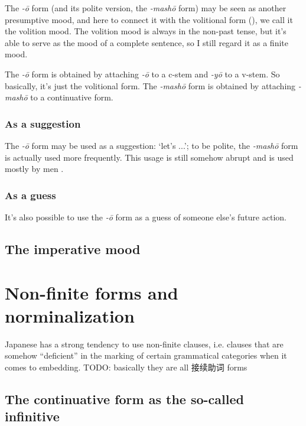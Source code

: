 \documentclass[UTF8, a4paper, oneside, scheme=plain]{ctexrep}
\newcommand*{\citepage}[1]{pp.~{#1}}
\newcommand{\corpus}[1]{\emph{#1}}
\newcommand{\translate}[1]{`#1'}
\begin{document}
The \corpus{-\={o}} form (and its polite version, the \corpus{-mash\={o}} form) 
may be seen as another presumptive mood,
and here to connect it with the volitional form (),
we call it the volition mood.
The volition mood is always in the non-past tense,
but it's able to serve as the mood of a complete sentence,
so I still regard it as a finite mood. 

The \corpus{-\={o}} form is obtained by attaching \corpus{-\={o}} to a c-stem 
and \corpus{-y\={o}} to a v-stem.
So basically, it's just the volitional form.
The \corpus{-mash\={o}} form is obtained by attaching \corpus{-mash\={o}} to a continuative form.

\subsubsection{As a suggestion}

The \corpus{-\={o}} form may be used as a suggestion: \translate{let's ...};
to be polite, the \corpus{-mash\={o}} form is actually used more frequently.
This usage is still somehow abrupt and is used mostly by men \citep[\citepage{112}]{akiyama2012japanese}.

\subsubsection{As a guess}

It's also possible to use the \corpus{-\={o}} form as a guess of someone else's future action.

\subsection{The imperative mood}\label{sec:imperative}

\section{Non-finite forms and norminalization}\label{sec:non-finite}

Japanese has a strong tendency to use non-finite clauses,
i.e. clauses that are somehow ``deficient'' in the marking of certain grammatical categories 
when it comes to embedding.
TODO: basically they are all 接续助词 forms

\subsection{The continuative form as the so-called infinitive}
\end{document}
